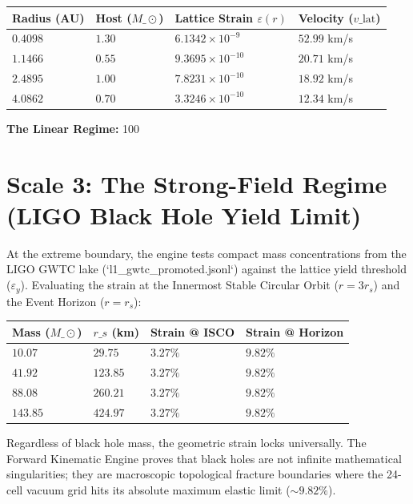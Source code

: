 \documentclass[11pt, letterpaper, openany]{book}
\begin{document}
\vspace{0.3cm}
\begin{center}
\renewcommand{\arraystretch}{1.2}
\small
\begin{tabular}{|p{2.5cm}|p{2.2cm}|p{3.2cm}|p{3.0cm}|}
\hline
\rowcolor{kishblue!12}
\textbf{Radius (AU)} & \textbf{Host ($M\_\odot$)} & \textbf{Lattice Strain $\varepsilon(r)$} & \textbf{Velocity ($v\_{\text{lat}}$)} \\
\hline
$0.4098$ & $1.30$ & $6.1342 \times 10^{-9}$ & $52.99$ km/s \\
\hline
$1.1466$ & $0.55$ & $9.3695 \times 10^{-10}$ & $20.71$ km/s \\
\hline
$2.4895$ & $1.00$ & $7.8231 \times 10^{-10}$ & $18.92$ km/s \\
\hline
$4.0862$ & $0.70$ & $3.3246 \times 10^{-10}$ & $12.34$ km/s \\
\hline
\end{tabular}
\end{center}
\vspace{0.3cm}

\textbf{The Linear Regime:} 100%

\section{Scale 3: The Strong-Field Regime (LIGO Black Hole Yield Limit)}

At the extreme boundary, the engine tests compact mass concentrations from the LIGO GWTC lake (`l1_gwtc_promoted.jsonl`) against the lattice yield threshold ($\varepsilon_y$). Evaluating the strain at the Innermost Stable Circular Orbit ($r = 3r_s$) and the Event Horizon ($r = r_s$):

\vspace{0.3cm}
\begin{center}
\renewcommand{\arraystretch}{1.2}
\small
\begin{tabular}{|p{3.2cm}|p{2.5cm}|p{2.5cm}|p{2.5cm}|}
\hline
\rowcolor{kishblue!12}
\textbf{Mass ($M\_\odot$)} & \textbf{$r\_s$ (km)} & \textbf{Strain @ ISCO} & \textbf{Strain @ Horizon} \\
\hline
$10.07$ & $29.75$ & $3.27\%$ & $\mathbf{9.82\%}$ \\
\hline
$41.92$ & $123.85$ & $3.27\%$ & $\mathbf{9.82\%}$ \\
\hline
$88.08$ & $260.21$ & $3.27\%$ & $\mathbf{9.82\%}$ \\
\hline
$143.85$ & $424.97$ & $3.27\%$ & $\mathbf{9.82\%}$ \\
\hline
\end{tabular}
\end{center}
\vspace{0.3cm}

Regardless of black hole mass, the geometric strain locks universally. The Forward Kinematic Engine proves that black holes are not infinite mathematical singularities; they are macroscopic topological fracture boundaries where the 24-cell vacuum grid hits its absolute maximum elastic limit ($\sim 9.82\%$).
\end{document}
